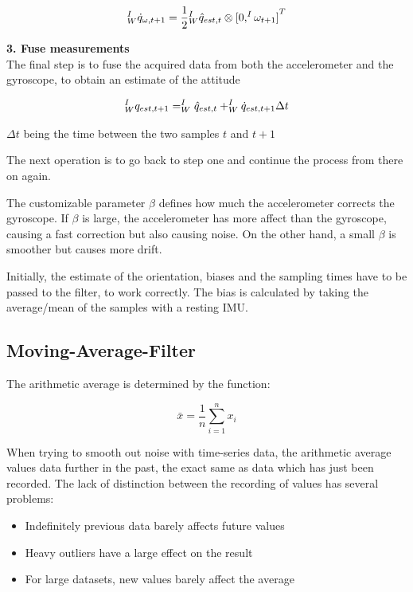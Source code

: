 \[
^I_W\dot{q}_{\omega,t+1} = \frac{1}{2} \\ ^I_W\hat{q}_{est,t} \otimes{{[0, ^I\omega_{t+1}]}^T}
\]

{\large \textbf{3. Fuse measurements}}\\[0.5em]
The final step is to fuse the acquired data from both the accelerometer and the gyroscope, to obtain an estimate of the attitude

\[
^I_W q_{est,t+1} = ^I_W\hat{q}_{est,t} + ^I_W\dot{q}_{est,t+1} \\ \Delta t
\]

$\Delta t$ being the time between the two samples $t$ and $t + 1$

The next operation is to go back to step one and continue the process from there on again.

The customizable parameter $\beta$ defines how much the accelerometer corrects the gyroscope. If $\beta$ is large, the accelerometer has more affect than the gyroscope, causing a fast correction but also causing noise. On the other hand, a small $\beta$ is smoother but causes more drift. 

Initially, the estimate of the orientation, biases and the sampling times have to be passed to the filter, to work correctly. The bias is calculated by taking the average/mean of the samples with a resting IMU\@.

\noindent\cite{LRWeb:50}

\subsection{Moving-Average-Filter}\label{title:maf}
The arithmetic average is determined by the function:

\[
\bar{x} = \frac{1}{n} \sum_{i=1}^{n} x_i
\]

When trying to smooth out noise with time-series data, the arithmetic average values data further in the past, the exact same as data which has just been recorded. The lack of distinction between the recording of values has several problems:

\begin{itemize}
    \item Indefinitely previous data barely affects future values
    \item Heavy outliers have a large effect on the result
    \item For large datasets, new values barely affect the average
\end{itemize}

